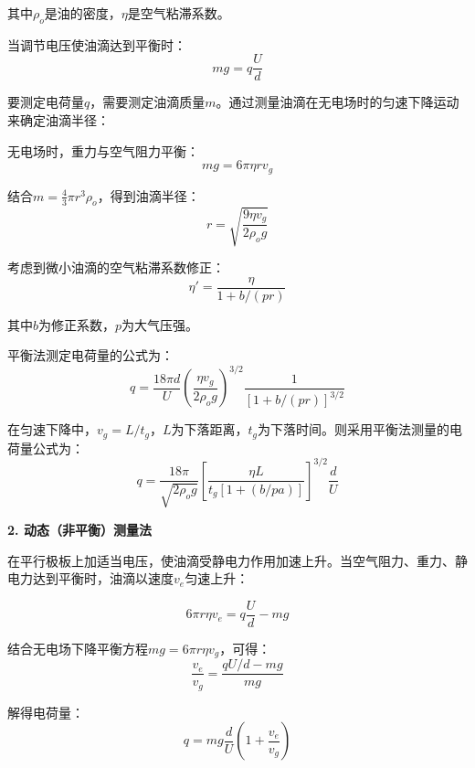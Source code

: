 \documentclass[dvipsnames, svgnames,a4paper,11pt]{article}
\begin{document}
其中$\rho_o$是油的密度，$\eta$是空气粘滞系数。

当调节电压使油滴达到平衡时：
\begin{equation}
mg = q\frac{U}{d}
\end{equation}

要测定电荷量$q$，需要测定油滴质量$m$。通过测量油滴在无电场时的匀速下降运动来确定油滴半径：

无电场时，重力与空气阻力平衡：
\begin{equation}
mg = 6\pi\eta rv_g
\end{equation}

结合$m = \frac{4}{3}\pi r^3 \rho_o$，得到油滴半径：
\begin{equation}
r = \sqrt{\frac{9\eta v_g}{2\rho_o g}}
\end{equation}

考虑到微小油滴的空气粘滞系数修正：
\begin{equation}
\eta' = \frac{\eta}{1+b/(pr)}
\end{equation}

其中$b$为修正系数，$p$为大气压强。

平衡法测定电荷量的公式为：
\begin{equation}
q = \frac{18\pi d}{U} \left(\frac{\eta v_g}{2\rho_o g}\right)^{3/2} \frac{1}{[1+b/(pr)]^{3/2}}
\label{equ:balance_method}
\end{equation}

在匀速下降中，$v_g = L/t_g$，$L$为下落距离，$t_g$为下落时间。则采用平衡法测量的电荷量公式为：
\begin{equation}
q=\frac{18 \pi}{\sqrt{2 \rho_o g}}\left[\frac{\eta L}{t_g[1+(b / p a)]}\right]^{3 / 2} \frac{d}{U}
\label{equ:balance_formula}
\end{equation}


\textbf{2. 动态（非平衡）测量法}

在平行极板上加适当电压，使油滴受静电力作用加速上升。当空气阻力、重力、静电力达到平衡时，油滴以速度$v_e$匀速上升：

\begin{equation}
6\pi r\eta v_e = q\frac{U}{d} - mg
\end{equation}

结合无电场下降平衡方程$mg = 6\pi r\eta v_g$，可得：
\begin{equation}
\frac{v_e}{v_g} = \frac{qU/d - mg}{mg}
\end{equation}

解得电荷量：
\begin{equation}
q = mg\frac{d}{U}\left(1+\frac{v_e}{v_g}\right)
\label{equ:dynamic_method}
\end{equation}
\end{document}
